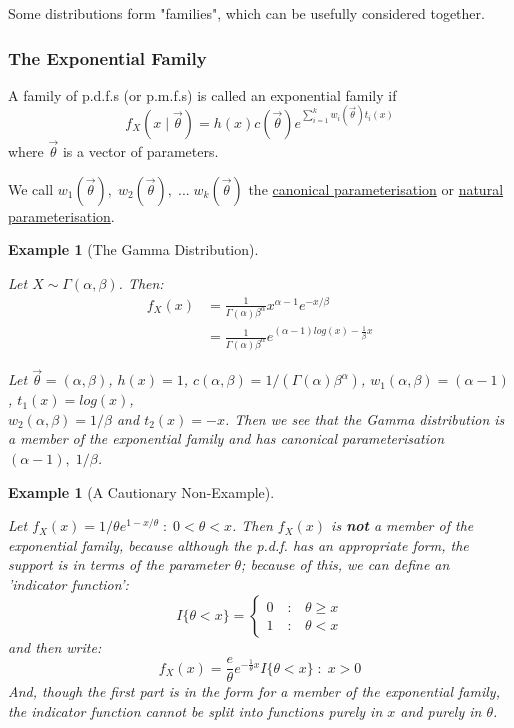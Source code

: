 \documentclass[12pt,a4paper]{article}
\newtheorem{ex}[thm]{Example}
\begin{document}
Some distributions form "families", which can be usefully considered together.

\subsubsection{The Exponential Family}

A family of p.d.f.s (or p.m.f.s) is called an exponential family if
$$f_X(x\; | \; \vec{\theta}) = h(x) c(\vec{\theta}) e^{\sum\limits_{i=1}^k w_i(\vec{\theta}) t_i(x)}$$
where $\vec{\theta}$ is a vector of parameters.

We call $w_1(\vec{\theta}),\; w_2(\vec{\theta}),\; ...\; w_k(\vec{\theta})$ the \underline{canonical parameterisation} or \underline{natural parameterisation}.

\begin{ex}[The Gamma Distribution]$\;$\par
\vspace{1cm}

Let $X \sim \Gamma(\alpha, \beta)$. Then:
\begin{align*}
f_X(x) &= \frac{1}{\Gamma(\alpha) \beta^\alpha} x^{\alpha-1}e^{-x/\beta}\\
&= \frac{1}{\Gamma(\alpha)\beta^\alpha}e^{(\alpha-1)log(x) - \frac{1}{\beta}x}
\end{align*}

Let $\vec{\theta} = (\alpha,\beta)$, $h(x) = 1$, $c(\alpha,\beta) = 1/(\Gamma(\alpha)\beta^\alpha)$, $w_1(\alpha,\beta) = (\alpha-1)$, $t_1(x) = log(x)$,\\ $w_2(\alpha, \beta) = 1/\beta$ and $t_2(x) = -x$. Then we see that the Gamma distribution is a member of the exponential family and has canonical parameterisation $(\alpha-1),\; 1/\beta$.

\end{ex}

\begin{ex}[A Cautionary Non-Example]$\;$\par
\vspace{1cm}

Let $f_X(x) = 1/\theta e^{1-x/\theta}\; : \; 0<\theta<x$. Then $f_X(x)$ is \textbf{not} a member of the exponential family, because although the p.d.f. has an appropriate form, the support is in terms of the parameter $\theta$; because of this, we can define an 'indicator function':
$$I\{\theta<x\} = \left\{\begin{array}{cl} 0 \quad :& \theta \geq x\\ 1\quad :& \theta<x \end{array}\right.$$
and then write:
$$f_X(x) = \frac{e}{\theta}e^{-\frac{1}{\theta}x}I\{\theta < x\}\; : \; x>0$$
And, though the first part is in the form for a member of the exponential family, the indicator function cannot be split into functions purely in $x$ and purely in $\theta$.

\end{ex}
\end{document}

